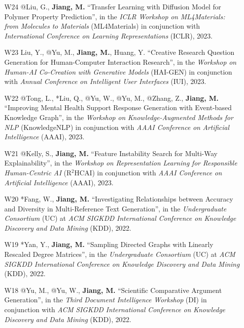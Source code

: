 \documentclass[10pt]{article}
\newenvironment{myindentpar}[1]%
{\begin{list}{}%
         {\setlength{\leftmargin}{#1}}%
         \item[]%
}
{\end{list}}
\newcounter{list}
\begin{document}
\begin{myindentpar}{0.00cm}
\begin{enumerate}[leftmargin=.5cm]
\item[W24] @Liu, G., \textbf{Jiang, M.} ``Transfer Learning with Diffusion Model for Polymer Property Prediction'', in the \textit{ICLR Workshop on ML4Materials: from Molecules to Materials} (ML4Materials) in conjunction with \textit{International Conference on Learning Representations} (ICLR), 2023.

\item[W23] Liu, Y., @Yu, M., \textbf{Jiang, M.}, Huang, Y. ``Creative Research Question Generation for Human-Computer Interaction Research'', in the \textit{Workshop on Human-AI Co-Creation with Generative Models} (HAI-GEN) in conjunction with \textit{Annual Conference on Intelligent User Interfaces} (IUI), 2023.

\item[W22] @Tong, L., *Liu, Q., @Yu, W., @Yu, M., @Zhang, Z., \textbf{Jiang, M.} ``Improving Mental Health Support Response Generation with Event-based Knowledge Graph'', in the \textit{Workshop on Knowledge-Augmented Methods for NLP} (KnowledgeNLP) in conjunction with \textit{AAAI Conference on Artificial Intelligence} (AAAI), 2023.

\item[W21] @Kelly, S., \textbf{Jiang, M.} ``Feature Instability Search for Multi-Way Explainability'', in the \textit{Workshop on Representation Learning for Responsible Human-Centric AI} (R$^2$HCAI) in conjunction with \textit{AAAI Conference on Artificial Intelligence} (AAAI), 2023.

\item[W20] *Fang, W., \textbf{Jiang, M.} ``Investigating Relationships between Accuracy and Diversity in Multi-Reference Text Generation'', in the \textit{Undergraduate Consortium} (UC) at \textit{ACM SIGKDD International Conference on Knowledge Discovery and Data Mining} (KDD), 2022.

\item[W19] *Yan, Y., \textbf{Jiang, M.} ``Sampling Directed Graphs with Linearly Rescaled Degree Matrices'', in the \textit{Undergraduate Consortium} (UC) at \textit{ACM SIGKDD International Conference on Knowledge Discovery and Data Mining} (KDD), 2022.

\item[W18] @Yu, M., @Yu, W., \textbf{Jiang, M.} ``Scientific Comparative Argument Generation'', in the \textit{Third Document Intelligence Workshop} (DI) in conjunction with \textit{ACM SIGKDD International Conference on Knowledge Discovery and Data Mining} (KDD), 2022.


\end{enumerate}
\end{myindentpar}
\end{document}
